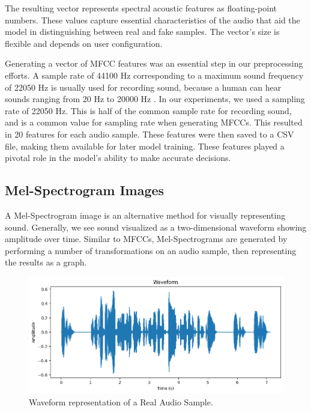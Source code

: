 \documentclass[sigconf,authordraft]{acmart}
\begin{document}
The resulting vector represents spectral acoustic features as floating-point numbers. These values capture essential characteristics of the audio that aid the model in distinguishing between real and fake samples. The vector's size is flexible and depends on user configuration. 

Generating a vector of MFCC features was an essential step in our preprocessing efforts. A sample rate of 44100 Hz corresponding to a maximum sound frequency of 22050 Hz is usually used for recording sound, because a human can hear sounds ranging from 20 Hz to 20000 Hz \cite{9252126}. In our experiments, we used a sampling rate of 22050 Hz. This is half of the common sample rate for recording sound, and is a common value for sampling rate when generating MFCCs. This resulted in 20 features for each audio sample. These features were then saved to a CSV file, making them available for later model training. These features played a pivotal role in the model's ability to make accurate decisions.

\subsection{Mel-Spectrogram Images}
A Mel-Spectrogram image is an alternative method for visually representing sound. Generally, we see sound visualized as a two-dimensional waveform showing amplitude over time. Similar to MFCCs, Mel-Spectrograms are generated by performing a number of transformations on an audio sample, then representing the results as a graph. 

\begin{figure}
  \centering
  \includegraphics[width=\linewidth]{images/real_waveform.png}
  \caption{Waveform representation of a Real Audio Sample.}
  \label{fig:real_waveform}
\end{figure}
\end{document}
